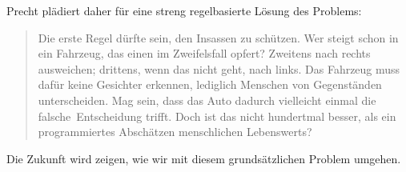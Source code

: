\documentclass[twoside,a4paper,12pt]{article}
\begin{document}
\noindent Precht plädiert daher für eine streng regelbasierte Lösung des Problems:

\begin{quote}
\glqq
Die erste Regel dürfte sein, den Insassen zu schützen. Wer steigt schon in ein Fahrzeug, das einen im Zweifelsfall opfert? Zweitens nach rechts ausweichen; drittens,
wenn das nicht geht, nach links. Das Fahrzeug muss dafür keine Gesichter erkennen, lediglich Menschen von Gegenständen unterscheiden. Mag sein, dass das Auto
dadurch vielleicht einmal die \glq falsche\grq\ Entscheidung trifft. Doch ist das nicht hundertmal besser, als ein programmiertes Abschätzen menschlichen Lebenswerts?\grqq\mbox{~\cite[S. 79]{pr}}
\end{quote}

\noindent Die Zukunft wird zeigen, wie wir mit diesem grundsätzlichen Problem umgehen.

\newpage

\cleardoublepage
\end{document}
